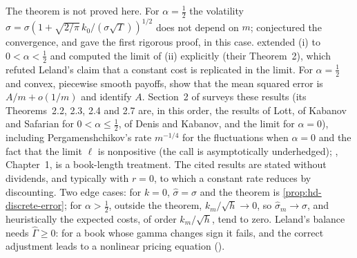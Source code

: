 The theorem is not proved here. For $\alpha=\frac12$ the volatility
$\hat\sigma=\sigma(1+\sqrt{2/\pi}\,k_0/(\sigma\sqrt T))^{1/2}$ does not depend on $m$; \textcite{leland-1985}
conjectured the convergence, and \textcite{lott-1993} gave the first rigorous proof, in this
case. \textcite{kabanov-safarian-1997} extended (i) to $0<\alpha<\frac12$ and computed the limit of
(ii) explicitly (their Theorem~2), which refuted Leland's claim that a constant cost is replicated
in the limit. For $\alpha=\frac12$ and convex, piecewise smooth payoffs, \textcite{denis-kabanov-2010}
show that the mean squared error is $A/m+o(1/m)$ and identify $A$. Section~2 of
\textcite{nguyen-pergamenshchikov-2017} surveys these results (its Theorems~2.2, 2.3, 2.4 and 2.7
are, in this order, the results of Lott, of Kabanov and Safarian for $0<\alpha\le\frac12$, of Denis and
Kabanov, and the limit for $\alpha=0$), including Pergamenshchikov's
rate $m^{-1/4}$ for the fluctuations when $\alpha=0$ and the fact that the limit $\ell$ is
nonpositive (the call is asymptotically underhedged); \textcite{kabanov-safarian-2009},
Chapter~1, is a book-length treatment. The cited
results are stated without dividends, and typically with $r=0$, to which a constant rate reduces
by discounting. Two edge cases: for $k=0$, $\hat\sigma=\sigma$ and the theorem is
\cref{prop:hd-discrete-error}; for $\alpha>\frac12$, outside the theorem, $k_m/\sqrt h\to0$, so $\hat\sigma_m\to\sigma$, and
heuristically the expected costs, of order $k_m/\sqrt h$, tend to zero. Leland's balance needs $\hat\Gamma\ge0$: for a book
whose gamma changes sign it fails, and the correct adjustment leads to a nonlinear pricing
equation ().

